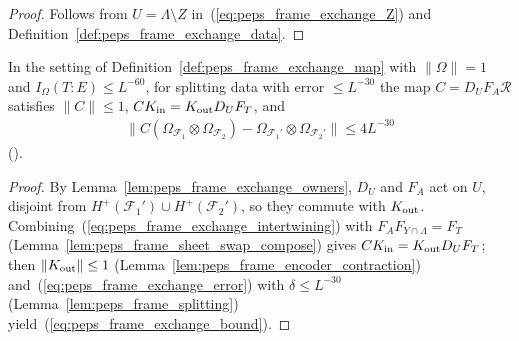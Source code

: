 \begin{proof}\leanok
    Follows from $U=\Lambda\setminus Z$ in~(\ref{eq:peps_frame_exchange_Z}) and
    Definition~\ref{def:peps_frame_exchange_data}.
\end{proof}

\begin{theorem}
    \label{thm:peps_frame_exchange}
    \leanok
    In the setting of Definition~\ref{def:peps_frame_exchange_map} with
    $\lVert\Omega\rVert=1$ and $I_\Omega(T:E)\le L^{-60}$, for splitting data
    with error $\le L^{-30}$ the map $C=D_UF_A\mathcal R$ satisfies
    $\|C\|\le 1$, $CK_{\rm in}=K_{\rm out}D_UF_T$, and
    \begin{align}
        \lVert C(\Omega_{\mathcal F_1}\otimes\Omega_{\mathcal F_2})
        -\Omega_{\mathcal F_1'}\otimes\Omega_{\mathcal F_2'}\rVert
        \le4L^{-30}
        \label{eq:peps_frame_exchange_bound}
    \end{align}
    (\cite[Lemma~6.6]{OpenAI2026PolynomialPEPS}).
\end{theorem}

\begin{proof}\leanok
    By Lemma~\ref{lem:peps_frame_exchange_owners}, $D_U$ and $F_A$ act on $U$,
    disjoint from $H^+(\mathcal F_1')\cup H^+(\mathcal F_2')$, so they commute
    with $K_{\rm out}$. Combining~(\ref{eq:peps_frame_exchange_intertwining})
    with $F_AF_{Y\cap\Lambda}=F_T$ (Lemma~\ref{lem:peps_frame_sheet_swap_compose})
    gives $CK_{\rm in}=K_{\rm out}D_UF_T$; then $\|K_{\rm out}\|\le 1$
    (Lemma~\ref{lem:peps_frame_encoder_contraction}) and~(\ref{eq:peps_frame_exchange_error})
    with $\delta\le L^{-30}$ (Lemma~\ref{lem:peps_frame_splitting}) yield~(\ref{eq:peps_frame_exchange_bound}).
\end{proof}

